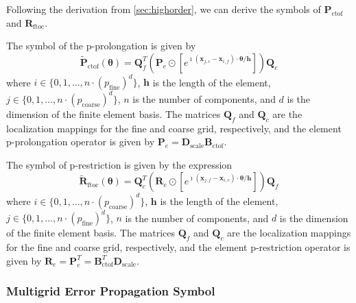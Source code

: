 \documentclass[review]{siamart190516}
\begin{document}
Following the derivation from \cref{sec:highorder}, we can derive the symbols of $\mathbf{P}_{\text{ctof}}$ and $\mathbf{R}_{\text{ftoc}}$.

\begin{definition}
The symbol of the p-prolongation is given by
\begin{equation}
\tilde{\mathbf{P}}_{\text{ctof}} \left( \boldsymbol{\theta} \right) = \mathbf{Q}_f^T \left( \mathbf{P}_e \odot \left[ e^{\imath \left( \mathbf{x}_{j, c} - \mathbf{x}_{i, f} \right) \cdot \boldsymbol{\theta} / \mathbf{h}} \right] \right) \mathbf{Q}_c
\end{equation}
where $i \in \lbrace 0, 1, \dots, n \cdot \left( p_{\text{fine}} \right)^d \rbrace$, $\mathbf{h}$ is the length of the element, $j \in \lbrace 0, 1, \dots, n \cdot \left( p_{\text{coarse}} \right)^d \rbrace$, $n$ is the number of components, and $d$ is the dimension of the finite element basis.
The matrices $\mathbf{Q}_f$ and $\mathbf{Q}_c$ are the localization mappings for the fine and coarse grid, respectively, and the element p-prolongation operator is given by $\mathbf{P}_e = \mathbf{D}_{\text{scale}} \mathbf{B}_{\text{ctof}}$.
\end{definition}\label{def:prolongation_symbol}

\begin{definition}
The symbol of p-restriction is given by the expression
\begin{equation}
\tilde{\mathbf{R}}_{\text{ftoc}} \left( \boldsymbol{\theta} \right) = \mathbf{Q}_c^T \left( \mathbf{R}_e \odot \left[ e^{\imath \left( \mathbf{x}_{j, f} - \mathbf{x}_{i, c} \right) \cdot \boldsymbol{\theta} / \mathbf{h}} \right] \right) \mathbf{Q}_f
\end{equation}
where $i \in \lbrace 0, 1, \dots, n \cdot \left( p_{\text{coarse}} \right)^d \rbrace$, $\mathbf{h}$ is the length of the element, $j \in \lbrace 0, 1, \dots, n \cdot \left( p_{\text{fine}} \right)^d \rbrace$, $n$ is the number of components, and $d$ is the dimension of the finite element basis.
The matrices $\mathbf{Q}_f$ and $\mathbf{Q}_c$ are the localization mappings for the fine and coarse grid, respectively, and the element p-restriction operator is given by $\mathbf{R}_e = \mathbf{P}_e^T = \mathbf{B}_{\text{ctof}}^T \mathbf{D}_{\text{scale}}$.
\end{definition}\label{def:restriction_symbol}

\subsubsection{Multigrid Error Propagation Symbol}\label{sec:multigridsymbol}
\end{document}
